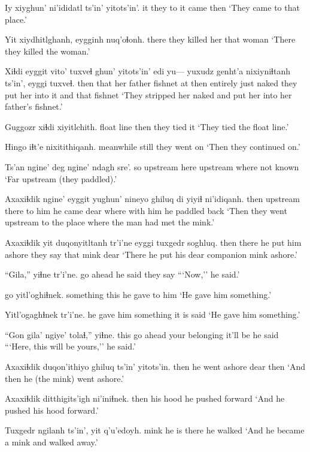 \documentclass[12pt]{article}
\begin{document}
\gll  Iy xiyghun' ni'ididatl ts'in' yitots'in'.
 it {they to it} came {} then
\glt  `They came to that place.' 
\glend

\gll Yit xiydhitlghanh, eygginh nuq'oɬonh.
there {they killed her} that  woman
\glt `There they killed the woman.'
\glend

\gll Xiɬdi eyggit vito'  tuxveɬ ghun' yitots'in' edi yu--- yuxudz genht'a nixiyniɬtanh ts'in', eyggi tuxveɬ.
then that {her father} fishnet at then  entirely {} just naked  {they put her into it} and that fishnet
\glt `They stripped her naked and put her into her father's fishnet.'
\glend

\gll Guggozr xiɬdi xiyitlchith.
{float line} then {they tied it}
\glt `They tied the float line.'
\glend

\gll Hingo iɬt'e nixitithiqanh.
meanwhile  still {they went on}
\glt `Then they continued on.'
\glend

\gll Ts'an ngine' deg ngine' ndagh sre'.
so upstream here upstream where  {not known}
\glt `Far upstream (they paddled).'
\glend

\gll Axaxiɬdik ngine'  eyggit yughun' nineyo ghiluq  di yiyiɬ  ni'idiqanh.
then  upstream there  {to him} {he came} dear  where {with him} {he paddled back}
\glt `Then they went upstream to the place where the man had met the mink.'
\glend

\gll Axaxiɬdik yit duqonyitltanh tr'i'ne  eyggi  tuxgedr soghluq.
then  there {he put him ashore} {they say} that  mink  dear
\glt `There he put his dear companion mink ashore.'
\glend

\gll ``Gila,'' yiɬne  tr'i'ne.
{go ahead}  {he said} {they say}
\glt ```Now,'' he said.'
\glend

 go  yitl'oghiɬnek.
something this  {he gave to him}
\glt `He gave him something.'
\glend

\gll Yitl'ogaghɬnek  tr'i'ne.
{he gave him something} {it is said}
\glt `He gave him something.'
\glend

\gll ``Gon gila' ngiye'  tolaɬ,'' yiɬne.
this {go ahead} {your belonging}  {it'll be} {he said}
\glt ```Here, this will be yours,'' he said.'
\glend

\gll Axaxiɬdik duqon'ithiyo ghiluq ts'in' yitots'in.
then  {he went ashore} dear {} then
\glt `And then he (the mink) went ashore.'
\glend

\gll Axaxiɬdik ditthigits'igh ni'iniɬnek.
then  {his hood} {he pushed forward}
\glt `And he pushed his hood forward.'
\glend

\gll Tuxgedr ngilanh ts'in', yit q'u'edoyh.
mink  {he is} {} there {he walked}
\glt `And he became a mink and walked away.'
\glend
\end{document}
